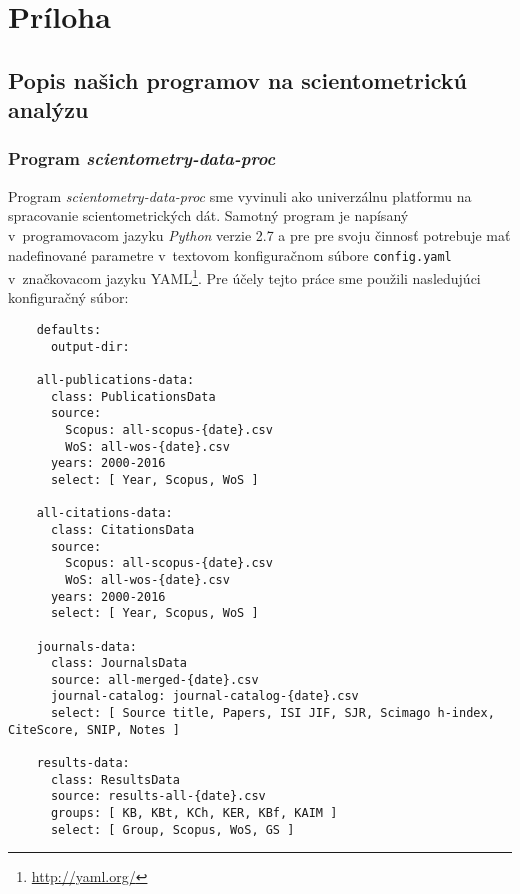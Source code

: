 \chapter*{Príloha}

\section*{Popis našich programov na scientometrickú analýzu}


\subsection*{Program \emph{scientometry-data-proc}}

Program \emph{scientometry-data-proc} sme vyvinuli ako univerzálnu platformu na
spracovanie scientometrických dát.  Samotný program je napísaný v~programovacom
jazyku \emph{Python} verzie 2.7 a pre pre svoju činnosť potrebuje mať
nadefinované parametre v~textovom konfiguračnom súbore \verb|config.yaml|
v~značkovacom jazyku YAML\footnote{\url{http://yaml.org/}}. Pre účely tejto
práce sme použili nasledujúci konfiguračný súbor:

\begin{source}
  \begin{verbatim}
    defaults:
      output-dir:

    all-publications-data:
      class: PublicationsData
      source:
        Scopus: all-scopus-{date}.csv
        WoS: all-wos-{date}.csv
      years: 2000-2016
      select: [ Year, Scopus, WoS ]

    all-citations-data:
      class: CitationsData
      source:
        Scopus: all-scopus-{date}.csv
        WoS: all-wos-{date}.csv
      years: 2000-2016
      select: [ Year, Scopus, WoS ]

    journals-data:
      class: JournalsData
      source: all-merged-{date}.csv
      journal-catalog: journal-catalog-{date}.csv
      select: [ Source title, Papers, ISI JIF, SJR, Scimago h-index, CiteScore, SNIP, Notes ]

    results-data:
      class: ResultsData
      source: results-all-{date}.csv
      groups: [ KB, KBt, KCh, KER, KBf, KAIM ]
      select: [ Group, Scopus, WoS, GS ]
  \end{verbatim}
\end{source}

